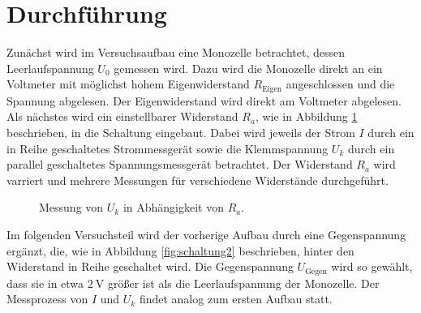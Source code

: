 \section{Durchführung}
\label{sec:Durchführung}

Zunächst wird im Versuchsaufbau eine Monozelle betrachtet, dessen Leerlaufspannung $U_0$ gemessen wird.
Dazu wird die Monozelle direkt an ein Voltmeter mit möglichst hohem Eigenwiderstand $R_{\text{Eigen}}$ angeschlossen und die Spannung abgelesen.
Der Eigenwiderstand wird direkt am Voltmeter abgelesen. \\
Als nächstes wird ein einstellbarer Widerstand $R_a$, wie in Abbildung \ref{fig:schaltung1} beschrieben, in die Schaltung eingebaut.%
Dabei wird jeweils der Strom $I$ durch ein in Reihe geschaltetes Strommessgerät sowie die Klemmspannung $U_k$ durch ein parallel geschaltetes Spannungsmessgerät betrachtet.
Der Widerstand $R_a$ wird varriert und mehrere Messungen für verschiedene Widerstände durchgeführt.

\begin{figure}[H]
  \centering
    \caption{Messung von $U_k$ in Abhängigkeit von $R_a$.}
    \label{fig:schaltung1}
\end{figure}

Im folgenden Versuchsteil wird der vorherige Aufbau durch eine Gegenspannung ergänzt, die, wie in Abbildung \ref{fig:schaltung2} beschrieben, hinter den Widerstand in Reihe geschaltet wird.
Die Gegenspannung $U_{\text{Gegen}}$ wird so gewählt, dass sie in etwa $\SI{2}{\volt}$ größer ist als die Leerlaufspannung der Monozelle.
Der Messprozess von $I$ und $U_k$ findet analog zum ersten Aufbau statt.


\tikzset{circuit declare symbol = DC source}

